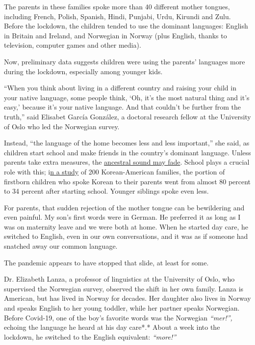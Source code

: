 The parents in these families spoke more than 40 different mother
tongues, including French, Polish, Spanish, Hindi, Punjabi, Urdu,
Kirundi and Zulu. Before the lockdown, the children tended to use the
dominant languages: English in Britain and Ireland, and Norwegian in
Norway (plus English, thanks to television, computer games and other
media).

Now, preliminary data suggests children were using the parents'
languages more during the lockdown, especially among younger kids.

``When you think about living in a different country and raising your
child in your native language, some people think, `Oh, it's the most
natural thing and it's easy,' because it's your native language. And
that couldn't be further from the truth,'' said Elisabet García
González, a doctoral research fellow at the University of Oslo who led
the Norwegian survey.

Instead, ``the language of the home becomes less and less important,''
she said, as children start school and make friends in the country's
dominant language. Unless parents take extra measures, the
\href{https://www.cambridge.org/core/journals/applied-psycholinguistics/article/parental-language-input-patterns-and-childrens-bilingual-use/821A5852222197491F4E7ABC8AA4B099}{ancestral
sound may fade}. School plays a crucial role with this;
i\href{https://www.jstor.org/stable/3588366?Search=yes\&resultItemClick=true\&searchText=birth\&searchText=order\&searchText=bilingual\&searchUri=\%2Faction\%2FdoBasicSearch\%3FQuery\%3Dbirth\%2Border\%2Bbilingual\&ab_segments=0\%2Fbasic_SYC-5187\%2Ftest\&refreqid=search\%3A5aa7f5c52530dc08951a6d8565c612a1\&seq=1}{n
a study} of 200 Korean-American families, the portion of firstborn
children who spoke Korean to their parents went from almost 80 percent
to 34 percent after starting school. Younger siblings spoke even less.

For parents, that sudden rejection of the mother tongue can be
bewildering and even painful. My son's first words were in German. He
preferred it as long as I was on maternity leave and we were both at
home. When he started day care, he switched to English, even in our own
conversations, and it was as if someone had snatched away our common
language.

The pandemic appears to have stopped that slide, at least for some.

Dr. Elizabeth Lanza, a professor of linguistics at the University of
Oslo, who supervised the Norwegian survey, observed the shift in her own
family. Lanza is American, but has lived in Norway for decades. Her
daughter also lives in Norway and speaks English to her young toddler,
while her partner speaks Norwegian. Before Covid-19, one of the boy's
favorite words was the Norwegian \emph{``mer!'',} echoing the language
he heard at his day care*.* About a week into the lockdown, he switched
to the English equivalent: \emph{``more!''}

